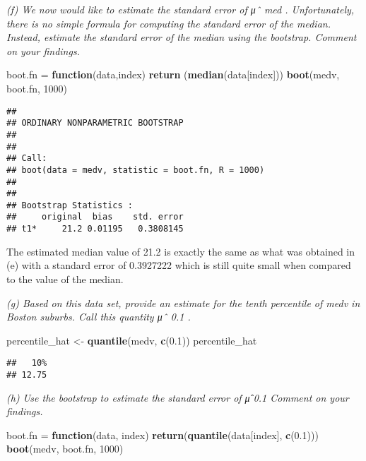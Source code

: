 \documentclass[]{article}
\newenvironment{Shaded}{\begin{snugshade}}{\end{snugshade}}
\newcommand{\KeywordTok}[1]{\textcolor[rgb]{0.13,0.29,0.53}{\textbf{#1}}}
\newcommand{\DecValTok}[1]{\textcolor[rgb]{0.00,0.00,0.81}{#1}}
\newcommand{\FloatTok}[1]{\textcolor[rgb]{0.00,0.00,0.81}{#1}}
\newcommand{\StringTok}[1]{\textcolor[rgb]{0.31,0.60,0.02}{#1}}
\newcommand{\ControlFlowTok}[1]{\textcolor[rgb]{0.13,0.29,0.53}{\textbf{#1}}}
\newcommand{\NormalTok}[1]{#1}
\begin{document}
\emph{(f) We now would like to estimate the standard error of μˆ med .
Unfortunately, there is no simple formula for computing the standard
error of the median. Instead, estimate the standard error of the median
using the bootstrap. Comment on your findings. }

\begin{Shaded}
\begin{Highlighting}[]
\NormalTok{boot.fn =}\StringTok{ }\ControlFlowTok{function}\NormalTok{(data,index) }\KeywordTok{return}\NormalTok{ (}\KeywordTok{median}\NormalTok{(data[index]))}
\KeywordTok{boot}\NormalTok{(medv, boot.fn, }\DecValTok{1000}\NormalTok{)}
\end{Highlighting}
\end{Shaded}

\begin{verbatim}
## 
## ORDINARY NONPARAMETRIC BOOTSTRAP
## 
## 
## Call:
## boot(data = medv, statistic = boot.fn, R = 1000)
## 
## 
## Bootstrap Statistics :
##     original  bias    std. error
## t1*     21.2 0.01195   0.3808145
\end{verbatim}

The estimated median value of 21.2 is exactly the same as what was
obtained in (e) with a standard error of 0.3927222 which is still quite
small when compared to the value of the median.

\emph{(g) Based on this data set, provide an estimate for the tenth
percentile of medv in Boston suburbs. Call this quantity μˆ 0.1 .}

\begin{Shaded}
\begin{Highlighting}[]
\NormalTok{percentile_hat <-}\StringTok{ }\KeywordTok{quantile}\NormalTok{(medv, }\KeywordTok{c}\NormalTok{(}\FloatTok{0.1}\NormalTok{))}
\NormalTok{percentile_hat}
\end{Highlighting}
\end{Shaded}

\begin{verbatim}
##   10% 
## 12.75
\end{verbatim}

\emph{(h) Use the bootstrap to estimate the standard error of μ̂ 0.1
Comment on your findings.}

\begin{Shaded}
\begin{Highlighting}[]
\NormalTok{boot.fn =}\StringTok{ }\ControlFlowTok{function}\NormalTok{(data, index) }\KeywordTok{return}\NormalTok{(}\KeywordTok{quantile}\NormalTok{(data[index], }\KeywordTok{c}\NormalTok{(}\FloatTok{0.1}\NormalTok{)))}
\KeywordTok{boot}\NormalTok{(medv, boot.fn, }\DecValTok{1000}\NormalTok{)}
\end{Highlighting}
\end{Shaded}
\end{document}
